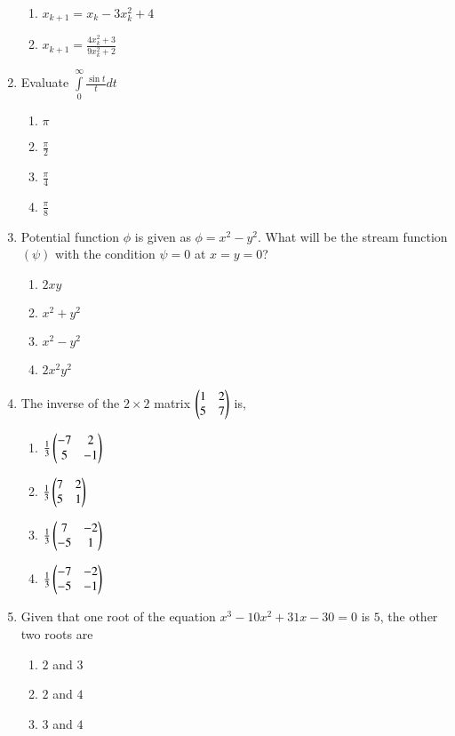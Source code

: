 \documentclass[journal,12pt,onecolumn]{IEEEtran}
\theoremstyle{remark}
\begin{document}
\begin{enumerate}[start=18]
\begin{enumerate}
		\item $x_{k+1}=x_k-3x_k^2+4$
		\item $x_{k+1}=\frac{4x_k^2+3}{9x_k^2+2}$
        \end{enumerate}   
\item Evaluate $\int\limits_{0}^{\infty} \frac{\sin t}{t} dt$
	\begin{enumerate}
                \item $\pi$
		\item $\frac{\pi}{2}$
		\item $\frac{\pi}{4}$
		\item $\frac{\pi}{8}$  
        \end{enumerate}
\item Potential function $\phi$ is given as $\phi=x^2-y^2$. What will be the stream function$(\psi)$ with the condition $\psi=0$ at $x=y=0$?
	\begin{enumerate}
                \item $2xy$
                \item $x^2+y^2$
                \item $x^2-y^2$
                \item $2x^2y^2$  
        \end{enumerate}
\item The inverse of the $2 \times 2$  matrix $\begin{pmatrix}1 & 2 \\ 5 & 7\end{pmatrix}$  is,
\begin{enumerate}
	\item $\frac{1}{3} \begin{pmatrix} -7 & 2 \\ 5 & -1 \end{pmatrix}$\\
\item $ \frac{1}{3} \begin{pmatrix}7 & 2 \\ 5 & 1\end{pmatrix}$\\
\item $\frac{1}{3} \begin{pmatrix}7 & -2 \\ -5 & 1\end{pmatrix}$\\
\item $\frac{1}{3} \begin{pmatrix}-7 & -2 \\ -5 & -1\end{pmatrix}$\\
		\end{enumerate}
\item Given that one root of the equation $x^3-10x^2+31x-30=0$ is $5$, the other two roots are
\begin{enumerate}
                \item $2$ and $3$
                \item $2$ and $4$
                \item $3$ and $4$

\end{enumerate}
\end{enumerate}
\end{document}
